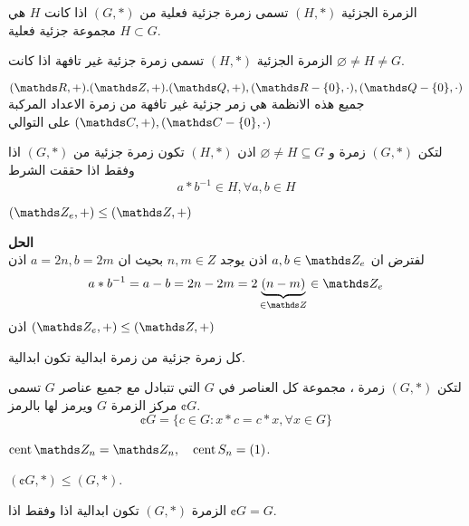 \begin{definition}
	الزمرة الجزئية $(H, *)$ تسمى زمرة جزئية فعلية من $(G, *)$ اذا كانت $H$ هي مجموعة جزئية فعلية $H \subset G$.
\end{definition}

\begin{definition}
		الزمرة الجزئية $(H, *)$ تسمى زمرة جزئية غير تافهة اذا كانت $\varnothing\neq H\neq G$.  
\end{definition}

\begin{example}
	$(\R, +). (\Z, +). (\Q, +), (\R-\{0\}, \cdot), (\Q-\{0\}, \cdot)$ جميع هذه الانظمة هي زمر جزئية غير تافهة من زمرة الاعداد المركبة $(\C, +), (\C-\{0\}, \cdot)$ على التوالي
\end{example}

\begin{theorem}
	لتكن $(G, *)$ زمرة و $\varnothing\neq H\subseteq G$ اذن $(H, *)$ تكون زمرة جزئية من $(G, *)$ اذا وفقط اذا حققت الشرط 
	\[
	a * b^{-1} \in H, \forall a, b\in H
	\]
\end{theorem}

\begin{example}
	$(\Z_e, +) \leq (\Z, +)$
\end{example}
\noindent
\textbf{الحل}\\
\noindent
لفترض ان $a, b\in \Z_e$ اذن يوجد $n,m\in Z$ بحيث ان $a=2n, b=2m$ اذن
\[
a * b^{-1} = a- b=2n-2m=2\underbrace{(n-m)}_{\in \Z} \in \Z_e
\]
اذن 	$(\Z_e, +) \leq (\Z, +)$

   \begin{note}
   	كل زمرة جزئية من زمرة ابدالية تكون ابدالية.
   \end{note}
   
   \begin{definition}
   	لتكن $(G, *)$ زمرة ، مجموعة كل العناصر في $G$ التي تتبادل مع جميع عناصر $G$ تسمى مركز الزمرة $G$ ويرمز لها بالرمز $\cent{G}$.
   	\[
   	\cent G = \{c \in G : x*c=c*x , \forall x\in G\}
   	\]
   \end{definition}
   
   \begin{example}
   	$\cent\Z_n=\Z_n, \quad \cent S_n = (1)$.
   \end{example}
   
   \begin{note}
   	$(\cent G, *) \leq (G, *)$.
   \end{note}
   
   \begin{lemma}
   	الزمرة $(G, *)$ تكون ابدالية اذا وفقط اذا $\cent G = G$.
   \end{lemma}
   
